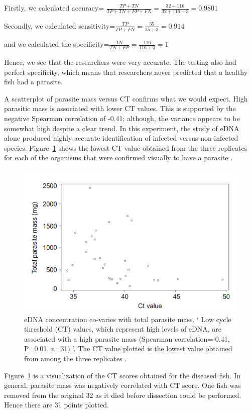 \vspace{5mm}

Firstly, we calculated accuracy= $\frac{TP+TN}{TP+TN+FP+FN}=\frac{32+116}{32+116+3}=0.9801$

Secondly, we calculated sensitivity=$\frac{TP}{TP+FN}=\frac{35}{35+3}=0.914$

and we calculated the specificity=$\frac{TN}{TN+FP}=\frac{116}{116+0}=1$

\vspace{5mm}

Hence, we see that the researchers were very accurate. The testing also had perfect specificity, which means that researchers never predicted that a healthy fish had a parasite.



\newpage

A scatterplot of parasite mass versus CT confirms what we would expect. High parasitic mass is associated with lower CT values. This is supported by the negative Spearman correlation of -0.41; although, the variance appears to be somewhat high despite a clear trend. In this experiment, the study of eDNA alone produced highly accurate identification of infected versus non-infected species. Figure~\ref{fig:parasite} shows the lowest CT value obtained from the three replicates for each of the organisms that were confirmed visually to have a parasite \citep{parasite}.



\begin{figure}[H]
\includegraphics{Chapter2Images/parasitect.png} 
\caption{eDNA concentration co-varies with total parasite mass. ` Low cycle threshold (CT) values, which represent high levels of eDNA, are associated with a high parasite mass (Spearman correlation=-0.41, P=0.01, n=31) '.  The CT value plotted is the lowest value obtained from among the three replicates \citep{parasite}.}
\label{fig:parasite}
\end{figure}

Figure~\ref{fig:parasite} is a visualization of the CT scores obtained for the diseased fish. In general, parasite mass was negatively correlated with CT score. One fish was removed from the original 32 as it died before dissection could be performed. Hence there are 31 points plotted.

